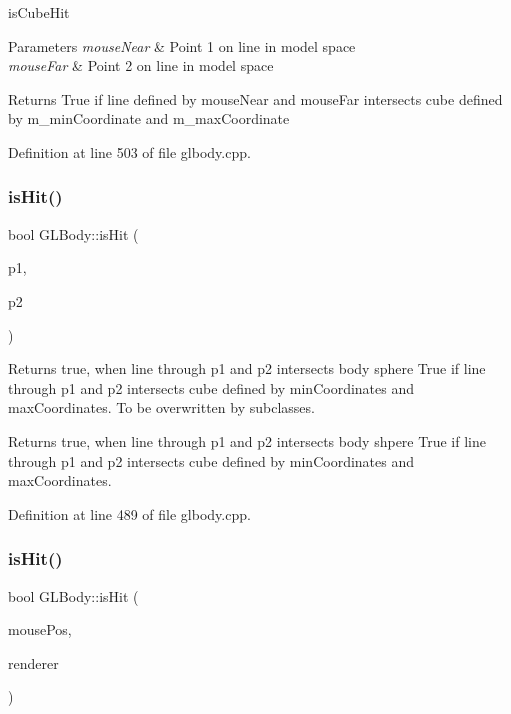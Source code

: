 is\+Cube\+Hit 


\begin{DoxyParams}{Parameters}
{\em mouse\+Near} & Point 1 on line in model space \\
\hline
{\em mouse\+Far} & Point 2 on line in model space \\
\hline
\end{DoxyParams}
\begin{DoxyReturn}{Returns}
True if line defined by mouse\+Near and mouse\+Far intersects cube defined by m\+\_\+min\+Coordinate and m\+\_\+max\+Coordinate 
\end{DoxyReturn}


Definition at line 503 of file glbody.\+cpp.

\mbox{\label{class_g_l_body_abe64b649f2b2ec09b2876d6382258e13}} 
\subsubsection{\texorpdfstring{isHit()}{isHit()}\hspace{0.1cm}{\footnotesize\ttfamily [1/2]}}
{\footnotesize\ttfamily bool G\+L\+Body\+::is\+Hit (\begin{DoxyParamCaption}\item[{Q\+Vector3D}]{p1,  }\item[{Q\+Vector3D}]{p2 }\end{DoxyParamCaption})\hspace{0.3cm}{\ttfamily [virtual]}}

Returns true, when line through p1 and p2 intersects body sphere True if line through p1 and p2 intersects cube defined by min\+Coordinates and max\+Coordinates. To be overwritten by subclasses.

Returns true, when line through p1 and p2 intersects body shpere True if line through p1 and p2 intersects cube defined by min\+Coordinates and max\+Coordinates. 

Definition at line 489 of file glbody.\+cpp.

\mbox{\label{class_g_l_body_ad6855369ac46247ffe0709731e889d23}} 
\subsubsection{\texorpdfstring{isHit()}{isHit()}\hspace{0.1cm}{\footnotesize\ttfamily [2/2]}}
{\footnotesize\ttfamily bool G\+L\+Body\+::is\+Hit (\begin{DoxyParamCaption}\item[{Q\+Point}]{mouse\+Pos,  }\item[{\mbox{\hyperlink{class_g_l_e_s_renderer}{G\+L\+E\+S\+Renderer}} $\ast$}]{renderer }\end{DoxyParamCaption})\hspace{0.3cm}{\ttfamily [virtual]}}



